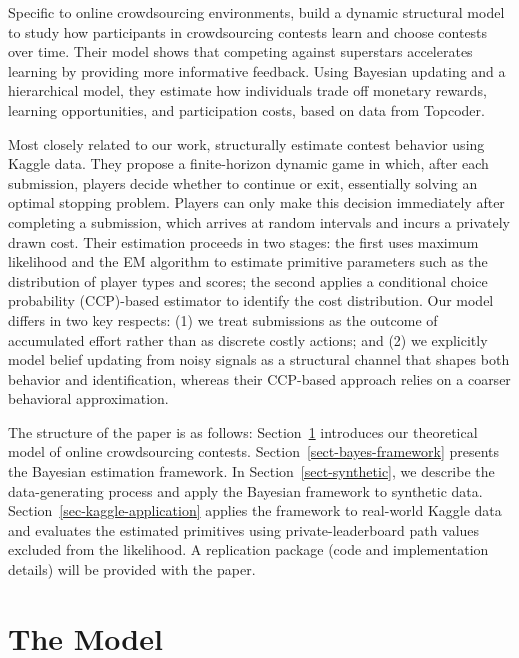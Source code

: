 \documentclass[mnsc]{informs3}
\begin{document}
Specific to online crowdsourcing environments,
\citet{zhang2019structural} build a dynamic structural model to study how participants in crowdsourcing contests learn and choose contests over time.
Their model shows that competing against superstars accelerates learning by providing more informative feedback.
Using Bayesian updating and a hierarchical model, they estimate how individuals trade off monetary rewards, learning opportunities, and participation costs, based on data from Topcoder.

Most closely related to our work, \citet{lemus2021dynamic} structurally estimate contest behavior using Kaggle data.
They propose a finite-horizon dynamic game in which, after each submission, players decide whether to continue or exit, essentially solving an optimal stopping problem.
Players can only make this decision immediately after completing a submission, which arrives at random intervals and incurs a privately drawn cost.
Their estimation proceeds in two stages: the first uses maximum likelihood and the EM algorithm to estimate primitive parameters such as the distribution of player types and scores; the second applies a conditional choice probability (CCP)-based estimator to identify the cost distribution.
Our model differs in two key respects:
(1) we treat submissions as the outcome of accumulated effort rather than as discrete costly actions; and
(2) we explicitly model belief updating from noisy signals as a structural channel that shapes both behavior and identification, whereas their CCP-based approach relies on a coarser behavioral approximation.







The structure of the paper is as follows:
Section~\ref{contest-theory} introduces our theoretical model of online crowdsourcing contests.
Section~\ref{sect-bayes-framework} presents the Bayesian estimation framework.
In Section~\ref{sect-synthetic}, we describe the data-generating process and apply the Bayesian framework to synthetic data.
Section~\ref{sec-kaggle-application} applies the framework to real-world Kaggle data and evaluates the estimated primitives using private-leaderboard path values excluded from the likelihood.
A replication package (code and implementation details) will be provided with the paper.



\section{The Model}\label{contest-theory}
\end{document}
